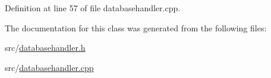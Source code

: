 Definition at line 57 of file databasehandler.\-cpp.



The documentation for this class was generated from the following files\-:\begin{DoxyCompactItemize}
\item 
src/\hyperlink{databasehandler_8h}{databasehandler.\-h}\item 
src/\hyperlink{databasehandler_8cpp}{databasehandler.\-cpp}\end{DoxyCompactItemize}
